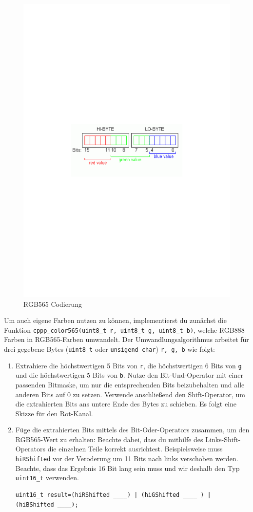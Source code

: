 \begin{figure}[!htb]
    \begin{centering}
        \includegraphics[width=.5\textwidth]{./05_c/figures/rgb565}
        \caption{RGB565 Codierung}
        \label{fig:rgb565}
    \end{centering}
\end{figure}
%
Um auch eigene Farben nutzen zu können, implementierst du zunächst die Funktion \lstinline|cppp_color565(uint8_t r, uint8_t g, uint8_t b)|, welche RGB888-Farben in RGB565-Farben umwandelt.
Der Umwandlungsalgorithmus arbeitet für drei gegebene Bytes (\lstinline|uint8_t| oder \lstinline|unsigend char|) \lstinline|r, g, b| wie folgt:
\begin{enumerate}
\item 
Extrahiere die höchstwertigen 5 Bits von \lstinline|r|, die höchstwertigen 6 Bits von \lstinline|g| und die höchstwertigen 5 Bits von \lstinline|b|.
Nutze den Bit-Und-Operator mit einer passenden Bitmaske, um nur die entsprechenden Bits beizubehalten und alle anderen Bits auf 0 zu setzen.
Verwende anschließend den Shift-Operator, um die extrahierten Bits ans untere Ende des Bytes zu schieben.
Es folgt eine Skizze für den Rot-Kanal.


\item 
Füge die extrahierten Bits mittels des Bit-Oder-Operators zusammen, um den RGB565-Wert zu erhalten:
Beachte dabei, dass du mithilfe des Links-Shift-Operators die einzelnen Teile korrekt ausrichtest.
Beispielsweise muss \lstinline|hiRShifted| vor der Veroderung um 11 Bits nach links verschoben werden.
Beachte, dass das Ergebnis 16 Bit lang sein muss und wir deshalb den Typ \lstinline|uint16_t| verwenden.

\lstinline$uint16_t result=(hiRShifted ____) | (hiGShifted ____ ) | (hiBShifted ____);$
\end{enumerate}


